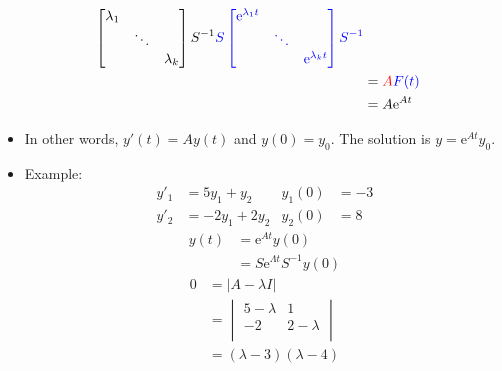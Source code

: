 \documentclass{article}
\newcommand{\e}{\text{e}}
\begin{document}
\begin{itemize}
\begin{align*}
{\begin{bmatrix}
            \lambda_1 &  & \\
             & \ddots & \\
             &  & \lambda_k\\
        \end{bmatrix}
        S^{-1}}{\color{blue}S
        \begin{bmatrix}
            \e^{\lambda_1t} &  & \\
             & \ddots & \\
             &  & \e^{\lambda_kt}\\
        \end{bmatrix}
        S^{-1}}\\
        &= {\color{red}A}{\color{blue}F(t)}\\
        &= A\e^{At}
    \end{align*}
    \item In other words, $y'(t)=Ay(t)$ and $y(0)=y_0$. The solution is $y=\e^{At}y_0$.
    \item Example:
    \begin{align*}
        y'_1 &= 5y_1+y_2& y_1(0) &= -3\\
        y'_2 &= -2y_1+2y_2& y_2(0) &= 8
    \end{align*}
    \begin{align*}
        y(t) &= \e^{At}y(0)\\
        &= S\e^{\Lambda t}S^{-1}y(0)
    \end{align*}
    \begin{align*}
        0 &= |A-\lambda I|\\
        &=
        \begin{vmatrix}
            5-\lambda & 1\\
            -2 & 2-\lambda\\
        \end{vmatrix}\\
        &= (\lambda-3)(\lambda-4)
    \end{align*}
\end{itemize}
\end{document}
